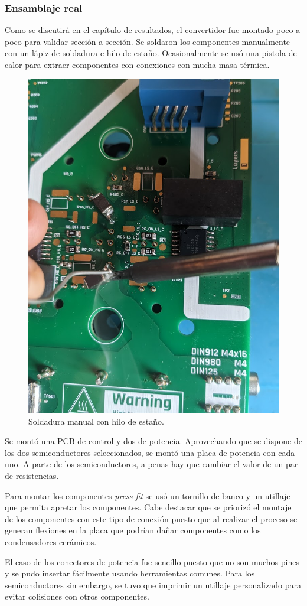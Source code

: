 \subsubsection{Ensamblaje real}

Como se discutirá en el capítulo de resultados, el convertidor fue montado poco a poco para validar sección a sección. Se soldaron los componentes manualmente con un lápiz de soldadura e hilo de estaño. Ocasionalmente se usó una pistola de calor para extraer componentes con conexiones con mucha masa térmica.

\begin{figure}[H]
	\centering
	\includegraphics[width=0.5\linewidth]{fig/assembly3}
	\caption{Soldadura manual con hilo de estaño.}
\end{figure}

Se montó una PCB de control y dos de potencia. Aprovechando que se dispone de los dos semiconductores seleccionados, se montó una placa de potencia con cada uno. A parte de los semiconductores, a penas hay que cambiar el valor de un par de resistencias.

Para montar los componentes \textit{press-fit} se usó un tornillo de banco y un utillaje que permita apretar los componentes. Cabe destacar que se priorizó el montaje de los componentes con este tipo de conexión puesto que al realizar el proceso se generan flexiones en la placa que podrían dañar componentes como los condensadores cerámicos.

El caso de los conectores de potencia fue sencillo puesto que no son muchos pines y se pudo insertar fácilmente usando herramientas comunes. Para los semiconductores sin embargo, se tuvo que imprimir un utillaje personalizado para evitar colisiones con otros componentes.

